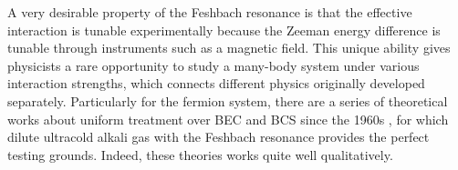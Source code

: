 A very desirable property of the Feshbach resonance is that the effective interaction is tunable experimentally because the Zeeman energy difference is tunable through  instruments such as a magnetic field.  
This unique ability gives physicists a rare opportunity to study  a many-body system under various interaction strengths, which connects different physics originally developed separately.  Particularly for the fermion system, there are a series of  theoretical works about uniform treatment over BEC and BCS since the 1960s \cite{Eagle,LeggettCrossover,Nozieres,RanderiaBEC}, for which dilute ultracold alkali gas with the Feshbach resonance provides the perfect testing grounds.  Indeed,  these theories works quite well  qualitatively.  



